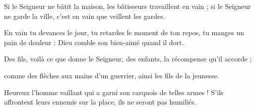 \item Si le Seigneur ne bâtit la maison, les bâtisseurs travaillent en vain ; si le Seigneur ne garde la ville, c'est en vain que veillent les gardes.

\item En vain tu devances le jour, tu retardes le moment de ton repos, tu manges un pain de douleur : Dieu comble son bien-aimé quand il dort.

\item Des fils, voilà ce que donne le Seigneur, des enfants, la récompense qu'il accorde ; 

\item comme des flèches aux mains d'un guerrier, ainsi les fils de la jeunesse.

\item Heureux l'homme vaillant qui a garni son carquois de telles armes ! S'ils affrontent leurs ennemis sur la place, ils ne seront pas humiliés.